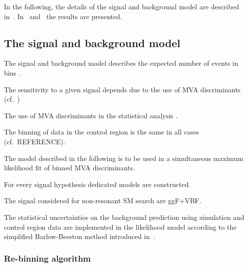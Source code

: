 In the following, the details of the signal and background model are
described in~. In~
and~ the results are presented.


\subsection{The signal and background model}%
\label{sec:sig_bkg_model}

The signal and background model describes the expected number of
events in bins .

The sensitivity to a given signal depends due to the use of MVA
discriminants (cf.\ )

The use of MVA discriminants in the statistical analysis .

The binning of data in the \ZHF control region is the same in all
cases (cf.\ REFERENCE).


The model described in the following is to be used in a simultaneous
maximum likelihood fit of binned MVA discriminants.

For every signal hypothesis dedicated models are constructed.

The signal considered for non-resonant SM \HH search are ggF+VBF.


The statistical uncertainties on the background prediction using
simulation and control region data are implemented in the likelihood
model according to the simplified Barlow-Beeston method introduced
in~.


\subsubsection{Re-binning algorithm}%
\label{sec:binning_alg}

